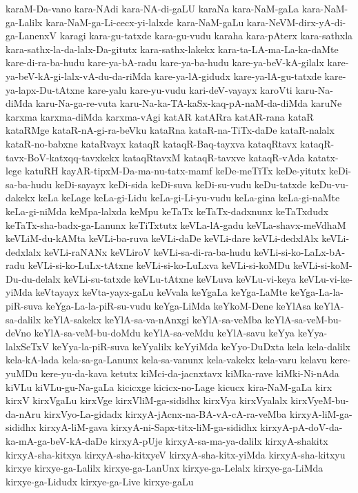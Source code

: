 {karaM-Da-vano
kara-NAdi
kara-NA-di-gaLU
karaNa
kara-NaM-gaLa
kara-NaM-ga-Lalilx
kara-NaM-ga-Li-cecx-yi-lalxde
kara-NaM-gaLu
kara-NeVM-dirx-yA-di-ga-LanenxV
karagi
kara-gu-tatxde
kara-gu-vudu
karaha
kara-pAterx
kara-sathxla
kara-sathx-la-da-lalx-Da-gitutx
kara-sathx-lakekx
kara-ta-LA-ma-La-ka-daMte
kare-di-ra-ba-hudu
kare-ya-bA-radu
kare-ya-ba-hudu
kare-ya-beV-kA-gilalx
kare-ya-beV-kA-gi-lalx-vA-du-da-riMda
kare-ya-lA-gidudx
kare-ya-lA-gu-tatxde
kare-ya-lapx-Du-tAtxne
kare-yalu
kare-yu-vudu
kari-deV-vayayx
karoVti
karu-Na-diMda
karu-Na-ga-re-vuta
karu-Na-ka-TA-kaSx-kaq-pA-naM-da-diMda
karuNe
karxma
karxma-diMda
karxma-vAgi
katAR
katARra
katAR-rana
kataR
kataRMge
kataR-nA-gi-ra-beVku
kataRna
kataR-na-TiTx-daDe
kataR-nalalx
kataR-no-babxne
kataRvayx
kataqR
kataqR-Baq-tayxva
kataqRtavx
kataqR-tavx-BoV-katxqq-tavxkekx
kataqRtavxM
kataqR-tavxve
kataqR-vAda
katatx-lege
katuRH
kayAR-tipxM-Da-ma-nu-tatx-mamf
keDe-meTiTx
keDe-yitutx
keDi-sa-ba-hudu
keDi-sayayx
keDi-sida
keDi-suva
keDi-su-vudu
keDu-tatxde
keDu-vu-dakekx
keLa
keLage
keLa-gi-Lidu
keLa-gi-Li-yu-vudu
keLa-gina
keLa-gi-naMte
keLa-gi-niMda
keMpa-lalxda
keMpu
keTaTx
keTaTx-dadxnunx
keTaTxdudx
keTaTx-sha-badx-ga-Lanunx
keTiTxtutx
keVLa-lA-gadu
keVLa-shavx-meVdhaM
keVLiM-du-kAMta
keVLi-ba-ruva
keVLi-daDe
keVLi-dare
keVLi-dedxlAlx
keVLi-dedxlalx
keVLi-raNANx
keVLiroV
keVLi-sa-di-ra-ba-hudu
keVLi-si-ko-LaLx-bA-radu
keVLi-si-ko-LuLx-tAtxne
keVLi-si-ko-LuLxva
keVLi-si-koMDu
keVLi-si-koM-Du-du-delalx
keVLi-su-tatxde
keVLu-tAtxne
keVLuva
keVLu-vi-keya
keVLu-vi-ke-yiMda
keVtayayx
keVta-yayx-gaLu
keVvala
keYgaLa
keYga-LaMte
keYga-La-la-piR-suva
keYga-La-la-piR-su-vudu
keYga-LiMda
keYkoM-Dene
keYlAsa
keYlA-sa-dalilx
keYlA-sakekx
keYlA-sa-va-nAnxgi
keYlA-sa-veMba
keYlA-sa-veM-bu-deVno
keYlA-sa-veM-bu-doMdu
keYlA-sa-veMdu
keYlA-savu
keYya
keYya-lalxSeTxV
keYya-la-piR-suva
keYyalilx
keYyiMda
keYyo-DuDxta
kela
kela-dalilx
kela-kA-lada
kela-sa-ga-Lanunx
kela-sa-vanunx
kela-vakekx
kela-varu
kelavu
kere-yuMDu
kere-yu-da-kava
ketutx
kiMci-da-jacnxtavx
kiMka-rave
kiMki-Ni-nAda
kiVLu
kiVLu-gu-Na-gaLa
kicicxge
kicicx-no-Lage
kicucx
kira-NaM-gaLa
kirx
kirxV
kirxVgaLu
kirxVge
kirxVliM-ga-sididhx
kirxVya
kirxVyalalx
kirxVyeM-bu-da-nAru
kirxVyo-La-gidadx
kirxyA-jAcnx-na-BA-vA-cA-ra-veMba
kirxyA-liM-ga-sididhx
kirxyA-liM-gava
kirxyA-ni-Sapx-titx-liM-ga-sididhx
kirxyA-pA-doV-da-ka-mA-ga-beV-kA-daDe
kirxyA-pUje
kirxyA-sa-ma-ya-dalilx
kirxyA-shakitx
kirxyA-sha-kitxya
kirxyA-sha-kitxyeV
kirxyA-sha-kitx-yiMda
kirxyA-sha-kitxyu
kirxye
kirxye-ga-Lalilx
kirxye-ga-LanUnx
kirxye-ga-Lelalx
kirxye-ga-LiMda
kirxye-ga-Lidudx
kirxye-ga-Live
kirxye-gaLu
}
